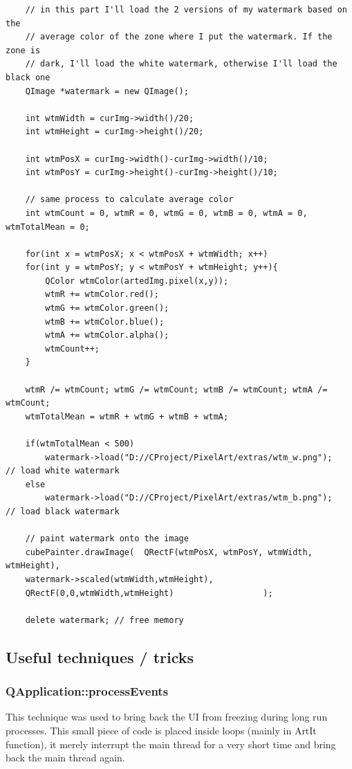 \documentclass[english]{article}
\begin{document}
{\begin{lstlisting}
	// in this part I'll load the 2 versions of my watermark based on the
	// average color of the zone where I put the watermark. If the zone is
	// dark, I'll load the white watermark, otherwise I'll load the black one
	QImage *watermark = new QImage();
	
	int wtmWidth = curImg->width()/20;
	int wtmHeight = curImg->height()/20;
	
	int wtmPosX = curImg->width()-curImg->width()/10;
	int wtmPosY = curImg->height()-curImg->height()/10;
	
	// same process to calculate average color
	int wtmCount = 0, wtmR = 0, wtmG = 0, wtmB = 0, wtmA = 0, wtmTotalMean = 0;
	
	for(int x = wtmPosX; x < wtmPosX + wtmWidth; x++)
	for(int y = wtmPosY; y < wtmPosY + wtmHeight; y++){
		QColor wtmColor(artedImg.pixel(x,y));
		wtmR += wtmColor.red();
		wtmG += wtmColor.green();
		wtmB += wtmColor.blue();
		wtmA += wtmColor.alpha();
		wtmCount++;
	}
	
	wtmR /= wtmCount; wtmG /= wtmCount; wtmB /= wtmCount; wtmA /= wtmCount;
	wtmTotalMean = wtmR + wtmG + wtmB + wtmA;
	
	if(wtmTotalMean < 500)
		watermark->load("D://CProject/PixelArt/extras/wtm_w.png");   // load white watermark
	else
		watermark->load("D://CProject/PixelArt/extras/wtm_b.png");   // load black watermark
	
	// paint watermark onto the image
	cubePainter.drawImage(  QRectF(wtmPosX, wtmPosY, wtmWidth, wtmHeight),
	watermark->scaled(wtmWidth,wtmHeight),
	QRectF(0,0,wtmWidth,wtmHeight)                  );
	
	delete watermark; // free memory
\end{lstlisting}


\newpage
	
\subsection{Useful techniques / tricks}	
		
\subsubsection{QApplication::processEvents}

This technique was used to bring back the UI from freezing during long run processes. This small piece of code is placed inside loops (mainly in ArtIt function), it merely interrupt the main thread for a very short time and bring back the main thread again.\newline

}
\end{document}
